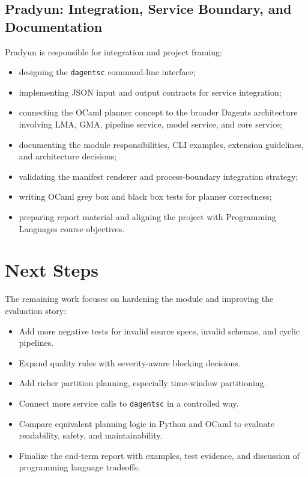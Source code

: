 \documentclass[conference]{IEEEtran}
\begin{document}
\subsection{Pradyun: Integration, Service Boundary, and Documentation}

Pradyun is responsible for integration and project framing:

\begin{itemize}
  \item designing the \texttt{dagentsc} command-line interface;
  \item implementing JSON input and output contracts for service integration;
  \item connecting the OCaml planner concept to the broader Dagents
  architecture involving LMA, GMA, pipeline service, model service, and core
  service;
  \item documenting the module responsibilities, CLI examples, extension
  guidelines, and architecture decisions;
  \item validating the manifest renderer and process-boundary integration
  strategy;
  \item writing OCaml grey box and black box tests for planner correctness;
  \item preparing report material and aligning the project with Programming
  Languages course objectives.
\end{itemize}

\section{Next Steps}

The remaining work focuses on hardening the module and improving the evaluation
story:

\begin{itemize}
  \item Add more negative tests for invalid source specs, invalid schemas, and
  cyclic pipelines.
  \item Expand quality rules with severity-aware blocking decisions.
  \item Add richer partition planning, especially time-window partitioning.
  \item Connect more service calls to \texttt{dagentsc} in a controlled way.
  \item Compare equivalent planning logic in Python and OCaml to evaluate
  readability, safety, and maintainability.
  \item Finalize the end-term report with examples, test evidence, and
  discussion of programming language tradeoffs.
\end{itemize}
\end{document}
